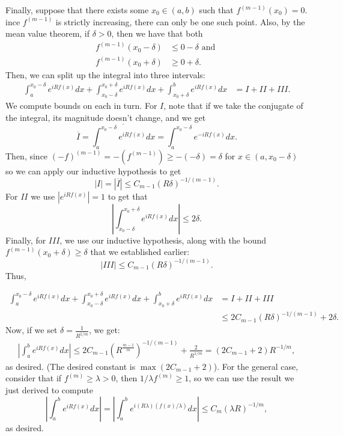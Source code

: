 \documentclass[11pt]{article}
\begin{document}
\begin{enumerate}
Finally, suppose that there exists some $x_0 \in (a, b)$ such that $f^{(m-1)}(x_0) = 0$.
ince $f^{(m-1)}$ is strictly increasing, there can only be one such point.
Also, by the mean value theorem, if $\delta > 0$, then we have that both
\begin{align*}
    f^{(m-1)}(x_0 - \delta) & \leq 0 - \delta \text{ and }\\
    f^{(m-1)}(x_0 + \delta) & \geq 0 + \delta 
.\end{align*}
Then, we can split up the integral into three intervals:
\begin{align*}
    \int_{a}^{x_0 - \delta} e^{i R f(x)} dx + \int_{x_0 - \delta}^{x_0 + \delta} e^{i R f(x)} dx + \int_{x_0 + \delta}^{b} e^{i R f(x)} dx &=  I + II + III
.\end{align*}
We compute bounds on each in turn.
For $I$, note that if we take the conjugate of the integral, its magnitude doesn't change, and we get
\[
\overline{I} =     \overline{\int_{a}^{x_0 - \delta} e^{i R f(x) } dx} = \int_{a}^{x_0 - \delta} e^{- i R f(x)} dx 
.\] 
Then, since $(-f)^{(m-1)} = -(f^{(m-1)}) \geq -(-\delta) = \delta$ for $x \in (a, x_0 - \delta)$ so we can apply our inductive hypothesis to get
\[
\left| I \right|  = \left| \overline{I} \right|  \leq C_{m-1}(R \delta)^{- 1 / (m-1)}
.\] 
For $II$ we use $\left| e^{iRf(x)} \right| = 1 $ to get that
\[
\left| \int_{x_0 - \delta}^{x_0 + \delta} e^{i R f(x)} dx  \right| \leq 2\delta
.\] 
Finally, for $III$, we use our inductive hypothesis, along with the bound $f^{(m-1)}(x_0 + \delta) \geq \delta$ that we established earlier:
\[
\left| III \right|  \leq C_{m-1} (R \delta)^{- 1 / (m-1)}
.\] 
Thus,

\begin{align*}
    \int_{a}^{x_0 - \delta} e^{i R f(x)} dx + \int_{x_0 - \delta}^{x_0 + \delta} e^{i R f(x)} dx + \int_{x_0 + \delta}^{b} e^{i R f(x)} dx &=  I + II + III\\
    &\leq 2 C_{m-1} (R \delta)^{- 1 / (m-1)} + 2\delta
.\end{align*}
Now, if we set $\delta = \frac{1}{R^{1 / m}}$, we get:
\begin{align*}
   \left| \int_{a}^{b} e^{i R f(x)} dx \right| \leq 2 C_{m-1} (R^{\frac{m-1}{m}})^{- 1 / (m-1)} +  \frac{2}{R^{1 / m}} = (2 C_{m-1} + 2) R^{- 1 / m}
,\end{align*}
as desired. (The desired constant is $\max (2 C_{m-1} + 2)$).
For the general case, consider that if $f^{(m)} \geq \lambda > 0$, then $1 / \lambda f^{(m)} \geq 1$, so we can use the result we just derived to compute 
\[
    \left| \int_{a}^{b} e^{i R f(x)}dx \right| = \left| \int_{a}^{b} e^{i (R \lambda)( f(x) / \lambda) } dx \right| \leq C_m (\lambda R)^{- 1 / m}
,\] 
as desired.



\end{enumerate}
\end{document}
